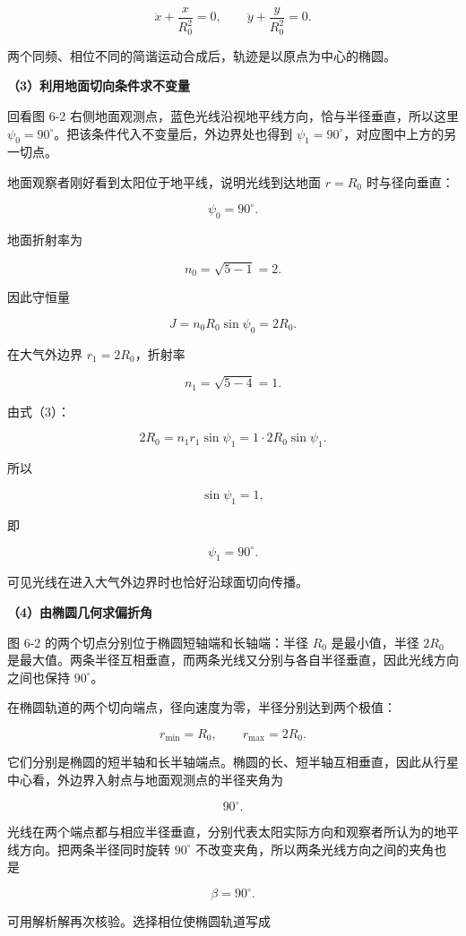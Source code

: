 \documentclass[12pt,a4paper,UTF8]{ctexart}
\begin{document}
\[
\ddot x+\frac{x}{R_0^2}=0,
\qquad
\ddot y+\frac{y}{R_0^2}=0.
\tag{8}
\]

两个同频、相位不同的简谐运动合成后，轨迹是以原点为中心的椭圆。

\textbf{（3）利用地面切向条件求不变量}

回看图 6-2
右侧地面观测点，蓝色光线沿视地平线方向，恰与半径垂直，所以这里
\(\psi_0=90^\circ\)。把该条件代入不变量后，外边界处也得到
\(\psi_1=90^\circ\)，对应图中上方的另一切点。

地面观察者刚好看到太阳位于地平线，说明光线到达地面 \(r=R_0\)
时与径向垂直：

\[
\psi_0=90^\circ.
\]

地面折射率为

\[
n_0=\sqrt{5-1}=2.
\]

因此守恒量

\[
J=n_0R_0\sin\psi_0=2R_0.
\tag{9}
\]

在大气外边界 \(r_1=2R_0\)，折射率

\[
n_1=\sqrt{5-4}=1.
\]

由式（3）：

\[
2R_0=n_1r_1\sin\psi_1
=1\cdot2R_0\sin\psi_1.
\]

所以

\[
\sin\psi_1=1,
\]

即

\[
\psi_1=90^\circ.
\tag{10}
\]

可见光线在进入大气外边界时也恰好沿球面切向传播。

\textbf{（4）由椭圆几何求偏折角}

图 6-2 的两个切点分别位于椭圆短轴端和长轴端：半径 \(R_0\) 是最小值，半径
\(2R_0\)
是最大值。两条半径互相垂直，而两条光线又分别与各自半径垂直，因此光线方向之间也保持
\(90^\circ\)。

在椭圆轨道的两个切向端点，径向速度为零，半径分别达到两个极值：

\[
r_{\min}=R_0,
\qquad
r_{\max}=2R_0.
\]

它们分别是椭圆的短半轴和长半轴端点。椭圆的长、短半轴互相垂直，因此从行星中心看，外边界入射点与地面观测点的半径夹角为

\[
90^\circ.
\]

光线在两个端点都与相应半径垂直，分别代表太阳实际方向和观察者所认为的地平线方向。把两条半径同时旋转
\(90^\circ\) 不改变夹角，所以两条光线方向之间的夹角也是

\[
\boxed{\beta=90^\circ}.
\tag{11}
\]

可用解析解再次核验。选择相位使椭圆轨道写成
\end{document}
